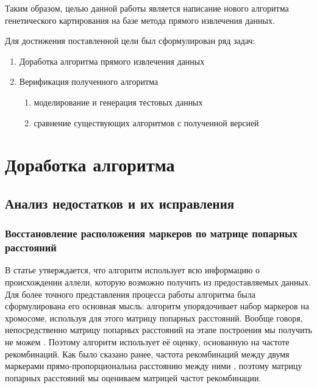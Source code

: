 \documentclass{matmex-diploma-custom}
\begin{document}
Таким образом, целью данной работы является написание нового алгоритма
генетического картирования на базе метода прямого извлечения данных.

\bigskip

Для достижения поставленной цели был сформулирован ряд задач:

\begin{enumerate}
\item Доработка алгоритма прямого извлечения данных
\item Верификация полученного алгоритма
  \begin{enumerate}
  \item моделирование и генерация тестовых
    данных
  \item сравнение существующих алгоритмов с полученной версией
  \end{enumerate}
\end{enumerate}

\section{Доработка алгоритма}

\subsection{Анализ недостатков и их исправления}

\subsubsection{Восстановление расположения маркеров по матрице
  попарных расстояний}

В статье \cite{sysoev} утверждается, что алгоритм использует всю
информацию о происхождении аллели, которую возможно получить из
предоставляемых данных. Для более точного представления процесса
работы алгоритма была сформулирована его основная мысль: алгоритм
упорядочивает набор маркеров на хромосоме, используя для этого матрицу
попарных расстояний. Вообще говоря, непосредственно матрицу попарных
расстояний на этапе построения мы получить не можем
\cite{bohonak2002ibd}. Поэтому алгоритм использует её оценку,
основанную на частоте рекомбинаций. Как было сказано ранее, частота
рекомбинаций между двумя маркерами прямо-пропорциональна расстоянию
между ними \cite{stam1993construction}, поэтому матрицу попарных
расстояний мы оцениваем матрицей частот рекомбинации.
\end{document}

